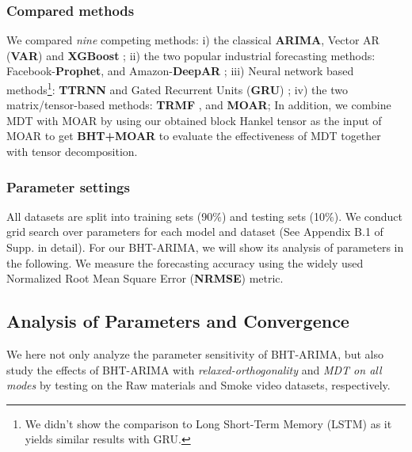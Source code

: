 \documentclass[letterpaper]{article} %
\numberwithin{theorem}{section}
\begin{document}
\subsubsection{Compared methods}
We  compared \textit{nine} competing methods:  i) the   classical
\textbf{ARIMA}, Vector AR (\textbf{VAR})  and \textbf{XGBoost}  \cite{chen2016xgboost}; ii) the two popular industrial forecasting methods: Facebook-\textbf{Prophet},  and Amazon-\textbf{DeepAR} \cite{salinas2017deepar}; iii) Neural network based methods\footnote{We didn't show the  comparison to Long Short-Term Memory (LSTM) as it yields similar results with GRU.}:  \textbf{TTRNN} \cite{yu2017long} and  Gated Recurrent Units (\textbf{GRU}) \cite{cho2014learning};   iv)  the two matrix/tensor-based  methods:
\textbf{TRMF} \cite{yu2016temporal},
 and
\textbf{MOAR};   In addition, we combine MDT with MOAR by using  our obtained block Hankel tensor as the input of   MOAR   to get
\textbf{BHT+MOAR} to evaluate the effectiveness of MDT together with tensor decomposition.

\subsubsection{Parameter settings}
All datasets are split into training sets (90$\%$) and testing sets (10$\%$).   We conduct grid search over parameters for each model and dataset (See Appendix B.1 of Supp. in detail). For our BHT-ARIMA, we will show its analysis of parameters in the following.
We measure the forecasting accuracy  using the widely used Normalized Root Mean Square Error (\textbf{NRMSE})    metric.

\subsection {Analysis of  Parameters  and	Convergence }
We here not only  analyze the parameter sensitivity of   BHT-ARIMA,  but also    study the effects of   BHT-ARIMA  with  \textit{relaxed-orthogonality} and \textit{MDT on all  modes} by testing on the {Raw materials} and Smoke video datasets, respectively.
\end{document}
